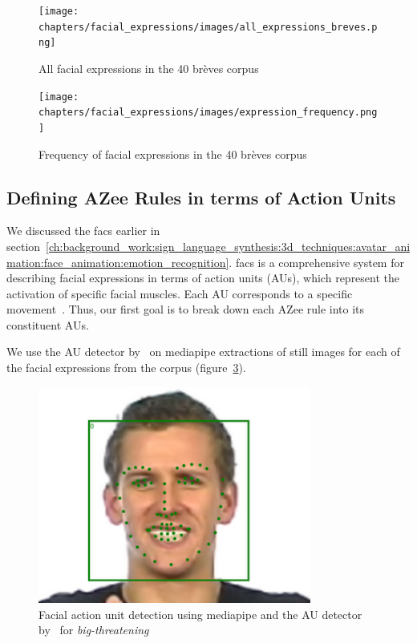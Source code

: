 \documentclass[../../main]{subfiles}
\begin{document}
\begin{figure}
    \centering
    \texttt{[image: chapters/facial\_expressions/images/all\_expressions\_breves.png]}
    \caption{All facial expressions in the 40 brèves corpus}
    \label{fig:all_expressions_breves}
\end{figure}

\begin{figure}
    \centering
    \texttt{[image: chapters/facial\_expressions/images/expression\_frequency.png]}
    \caption{Frequency of facial expressions in the 40 brèves corpus}
    \label{fig:expression_frequency}
\end{figure}

\subsection{Defining AZee Rules in terms of Action Units}
\label{ch:facial_expressions:defining_azee_rules_in_terms_of_action_units}

We discussed the \gls{facs} earlier in section~\ref{ch:background_work:sign_language_synthesis:3d_techniques:avatar_animation:face_animation:emotion_recognition}. \gls{facs} is a comprehensive system for describing facial expressions in terms of action units (AUs), which represent the activation of specific facial muscles. Each AU corresponds to a specific movement~. Thus, our first goal is to break down each AZee rule into its constituent AUs. 

We use the AU detector by~\cite{luo2022learning} on mediapipe extractions of still images for each of the facial expressions from the corpus (figure~\ref{ch:facial_expressions:fig:face_detect}).

\begin{figure}
    \centering
    \includegraphics[width=0.8\textwidth]{chapters/facial_expressions/images/face_detect.png}
    \caption{Facial action unit detection using mediapipe and the AU detector by~\cite{luo2022learning} for \emph{big-threatening}}
    \label{ch:facial_expressions:fig:face_detect}
\end{figure}
\end{document}
